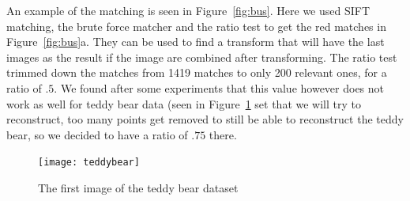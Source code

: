An example of the matching is seen in Figure~\ref{fig:bus}. 
Here we used SIFT matching, the brute force matcher and the ratio test to get the red matches in Figure~\ref{fig:bus}a. 
They can be used to find a transform that will have the last images as the result if the image are combined after transforming.
The ratio test trimmed down the matches from 1419 matches to only 200 relevant ones, for a ratio of $.5$. We found after some experiments that this value however does not work as well for teddy bear data (seen in Figure~\ref{fig:bear} set that we will try to reconstruct, too many points get removed to still be able to reconstruct the teddy bear, so we decided to have a ratio of $.75$ there.

\begin{figure}[ht]
	\centering
	\texttt{[image: teddybear]}
	\caption{The first image of the teddy bear dataset}
	\label{fig:bear}
\end{figure}
